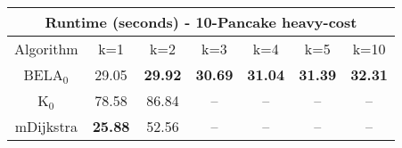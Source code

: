 \begin{tabular}{c|cccccc}\toprule
\multicolumn{7}{c}{Runtime (seconds) - 10-Pancake heavy-cost}\\ \midrule
Algorithm & k=1 & k=2 & k=3 & k=4 & k=5 & k=10 \\ \midrule
BELA$_0$ & 29.05 & \textbf{29.92} & \textbf{30.69} & \textbf{31.04} & \textbf{31.39} & \textbf{32.31} \\
K$_0$ & 78.58 & 86.84 & -- & -- & -- & -- \\
mDijkstra & \textbf{25.88} & 52.56 & -- & -- & -- & -- \\ \bottomrule 
\end{tabular}
